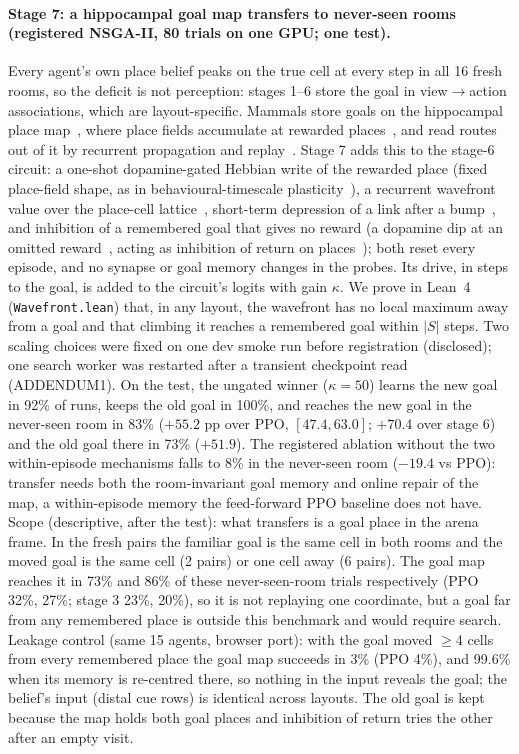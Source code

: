 \documentclass[10pt,onecolumn,letterpaper]{article}
\begin{document}
\paragraph{Stage 7: a hippocampal goal map transfers to never-seen rooms (registered NSGA-II, 80 trials on one GPU; one test).}
Every agent's own place belief peaks on the true cell at every step in all 16 fresh rooms, so the deficit is not perception: stages
1--6 store the goal in view$\to$action associations, which are layout-specific. Mammals store goals on the hippocampal place
map~\cite{tolman1948,okeefe1978}, where place fields accumulate at rewarded places~\cite{hollup2001,dupret2010}, and read routes
out of it by recurrent propagation and replay~\cite{ponulak2013,pfeiffer2013}. Stage 7 adds this to the stage-6 circuit: a one-shot
dopamine-gated Hebbian write of the rewarded place (fixed place-field shape, as in behavioural-timescale plasticity~\cite{bittner2017}),
a recurrent wavefront value over the place-cell lattice~\cite{ponulak2013}, short-term depression of a link after a
bump~\cite{tsodyks1997}, and inhibition of a remembered goal that gives no reward (a dopamine dip at an omitted
reward~\cite{hollerman1998}, acting as inhibition of return on places~\cite{posner1984}); both reset every episode, and no synapse or
goal memory changes in the probes. Its drive, in steps to the goal, is added to the circuit's logits with gain
$\kappa$. We prove in Lean~4 (\texttt{Wavefront.lean}) that, in any layout, the wavefront has no local maximum away from a goal and
that climbing it reaches a remembered goal within $|S|$ steps. Two scaling choices were fixed on one dev smoke run before
registration (disclosed); one search worker was restarted after a transient checkpoint read (ADDENDUM1). On the test, the ungated
winner ($\kappa=50$) learns the new goal in 92\% of runs, keeps the old goal in 100\%, and reaches the new goal in the never-seen room
in 83\% ($+55.2$ pp over PPO, $[47.4,63.0]$; $+70.4$ over stage 6) and the old goal there in 73\% ($+51.9$). The registered ablation
without the two within-episode mechanisms falls to 8\% in the never-seen room ($-19.4$ vs PPO): transfer needs both the room-invariant
goal memory and online repair of the map, a within-episode memory the feed-forward PPO baseline does not have.
Scope (descriptive, after the test): what transfers is a goal place in the arena frame. In the fresh pairs the familiar goal is the
same cell in both rooms and the moved goal is the same cell (2 pairs) or one cell away (6 pairs). The goal map reaches it in
73\% and 86\% of these never-seen-room trials respectively (PPO 32\%, 27\%; stage 3 23\%, 20\%), so it is not replaying one
coordinate, but a goal far from any remembered place is outside this benchmark and would require search. Leakage control (same
15 agents, browser port): with the goal moved $\ge$4 cells from every remembered place the goal map succeeds in 3\% (PPO 4\%),
and 99.6\% when its memory is re-centred there, so nothing in the input reveals the goal; the belief's input (distal cue rows)
is identical across layouts. The old goal is kept because the map holds both goal places and inhibition of return tries the
other after an empty visit.
\end{document}
